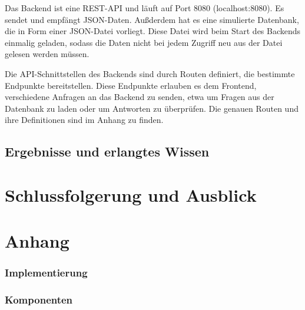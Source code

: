 \documentclass[biblatex]{lni}
\begin{document}
Das Backend ist eine REST-API und läuft auf Port 8080 (localhost:8080).
Es sendet und empfängt JSON-Daten.
Außderdem hat es eine simulierte Datenbank, die in Form einer JSON-Datei vorliegt.
Diese Datei wird beim Start des Backends einmalig geladen,
sodass die Daten nicht bei jedem Zugriff neu aus der Datei gelesen werden müssen.

Die API-Schnittstellen des Backends sind durch Routen definiert, die bestimmte Endpunkte bereitstellen.
Diese Endpunkte erlauben es dem Frontend, verschiedene Anfragen an das Backend zu senden, etwa um Fragen aus der Datenbank zu laden oder um Antworten zu überprüfen.
Die genauen Routen und ihre Definitionen sind im Anhang zu finden.

\subsection{Ergebnisse und erlangtes Wissen}

\section{Schlussfolgerung und Ausblick}

\newpage
\section{Anhang}
\subsubsection{Implementierung}

\subsubsection{Komponenten}
\end{document}
